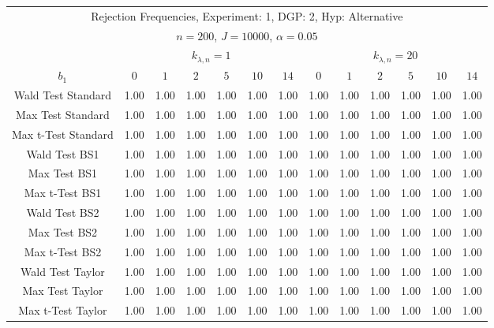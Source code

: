  \begin{table}[H] 
 \singlespacing 
 \small 
 \centering 
\begin{tabular}{c|cccccc|cccccc} 
\multicolumn{13}{c}{ Rejection Frequencies, Experiment: 1, DGP: 2, Hyp: Alternative } \\ 
\multicolumn{13}{c}{ $n=200$, $J=10000$, $\alpha = 0.05$ } \\ 
  \multicolumn{1}{c}{} & \multicolumn{6}{c}{ $k_{\lambda,n}=1$ } & \multicolumn{6}{c}{ $k_{\lambda,n}=20$ } \\ 
 \hline 
 $b_{1}$ & $0$ & $1$ & $2$ & $5$ & $10$ & $14$ & $0$ & $1$ & $2$ & $5$ & $10$ & $14$   \\ 
 \hline  
 \hline 
 Wald Test Standard &  1.00 &  1.00 &  1.00 &  1.00 &  1.00 &  1.00 &  1.00 &  1.00 &  1.00 &  1.00 &  1.00 &  1.00 \\ 
 Max Test Standard &  1.00 &  1.00 &  1.00 &  1.00 &  1.00 &  1.00 &  1.00 &  1.00 &  1.00 &  1.00 &  1.00 &  1.00 \\ 
 Max t-Test Standard &  1.00 &  1.00 &  1.00 &  1.00 &  1.00 &  1.00 &  1.00 &  1.00 &  1.00 &  1.00 &  1.00 &  1.00 \\ 
 \hline  
 Wald Test BS1 &  1.00 &  1.00 &  1.00 &  1.00 &  1.00 &  1.00 &  1.00 &  1.00 &  1.00 &  1.00 &  1.00 &  1.00 \\ 
 Max Test BS1 &  1.00 &  1.00 &  1.00 &  1.00 &  1.00 &  1.00 &  1.00 &  1.00 &  1.00 &  1.00 &  1.00 &  1.00 \\ 
 Max t-Test BS1 &  1.00 &  1.00 &  1.00 &  1.00 &  1.00 &  1.00 &  1.00 &  1.00 &  1.00 &  1.00 &  1.00 &  1.00 \\ 
 \hline  
 Wald Test BS2 &  1.00 &  1.00 &  1.00 &  1.00 &  1.00 &  1.00 &  1.00 &  1.00 &  1.00 &  1.00 &  1.00 &  1.00 \\ 
 Max Test BS2 &  1.00 &  1.00 &  1.00 &  1.00 &  1.00 &  1.00 &  1.00 &  1.00 &  1.00 &  1.00 &  1.00 &  1.00 \\ 
 Max t-Test BS2 &  1.00 &  1.00 &  1.00 &  1.00 &  1.00 &  1.00 &  1.00 &  1.00 &  1.00 &  1.00 &  1.00 &  1.00 \\ 
 \hline  
 Wald Test Taylor &  1.00 &  1.00 &  1.00 &  1.00 &  1.00 &  1.00 &  1.00 &  1.00 &  1.00 &  1.00 &  1.00 &  1.00 \\ 
 Max Test Taylor &  1.00 &  1.00 &  1.00 &  1.00 &  1.00 &  1.00 &  1.00 &  1.00 &  1.00 &  1.00 &  1.00 &  1.00 \\ 
 Max t-Test Taylor &  1.00 &  1.00 &  1.00 &  1.00 &  1.00 &  1.00 &  1.00 &  1.00 &  1.00 &  1.00 &  1.00 &  1.00 \\ 
 \hline 
\end{tabular}
 \end{table}
